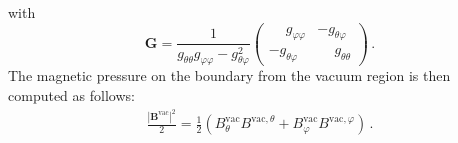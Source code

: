 with
\begin{equation}
  \mathbf{G} =
  \frac{1}{ g_{\theta \theta} g_{\varphi \varphi} - g_{\theta \varphi}^2 }
  \begin{pmatrix}
    \phantom{-} g_{\varphi \varphi} &          -  g_{\theta \varphi} \\
             -  g_{\theta  \varphi} & \phantom{-} g_{\theta \theta }
  \end{pmatrix} \, .
\end{equation}
The magnetic pressure on the boundary from the vacuum region is then computed as follows:
\begin{align}
 \frac{|\mathbf{B}^{\textrm{vac}}|^2}{2}
 = \frac{1}{2} \left(   B^{\textrm{vac}}_\theta  B^{\textrm{vac}, \theta }
                      + B^{\textrm{vac}}_\varphi B^{\textrm{vac}, \varphi} \right) \, .
\end{align}
